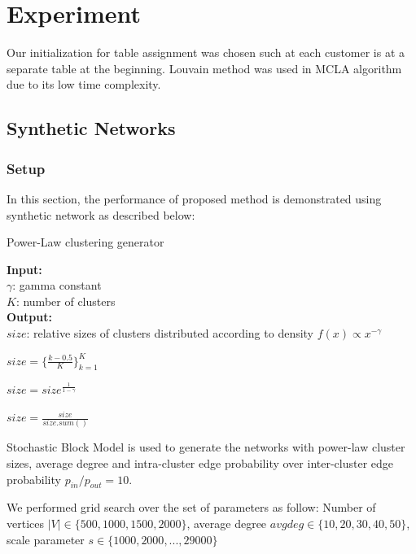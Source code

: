 \chapter{Experiment}
Our initialization for table assignment was chosen such at each customer is at a separate table at the beginning. Louvain method \cite{blondel2008fast} was used in MCLA algorithm due to its low time complexity.
\section{Synthetic Networks}

\subsection{Setup}

In this section, the performance of proposed method is demonstrated using synthetic network as described below:

\begin{algorithm}[H]
\label{alg:powerlaw}
\caption{Power-Law clustering generator}
\textbf{Input:}\\
    $\gamma$: gamma constant \\
    $K$: number of clusters\\

\textbf{Output:}\\
    $size$: relative sizes of clusters distributed according to density $f(x) \propto x^{-\gamma}$\\
    
\begin{algorithmic}

\State $size = \{\frac{k - 0.5}{K}\}_{k=1}^{K}$

\State $size = size^\frac{1}{1 - \gamma}$ 

\State $size = \frac{size}{size.sum()}$ 

\end{algorithmic}
\end{algorithm}

Stochastic Block Model is used to generate the networks with power-law cluster sizes, average degree and intra-cluster edge probability over inter-cluster edge probability $p_{in} / p_{out} = 10$.

We performed grid search over the set of parameters as follow: Number of vertices $|V| \in \{500, 1000, 1500, 2000\}$, average degree $avgdeg \in \{10, 20, 30, 40, 50\}$, scale parameter $s \in \{1000, 2000, ..., 29000\}$

